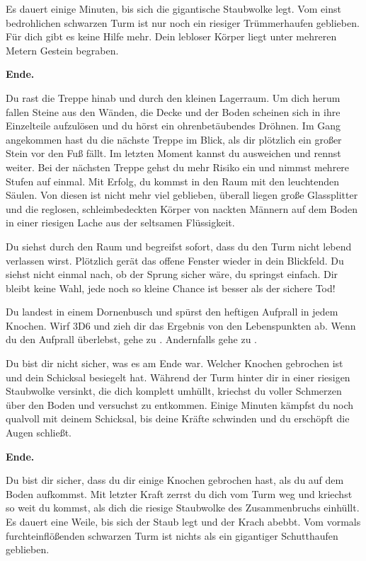 Es dauert einige Minuten, bis sich die gigantische Staubwolke legt. Vom einst bedrohlichen schwarzen Turm ist nur noch ein riesiger Trümmerhaufen geblieben. Für dich gibt es keine Hilfe mehr. Dein lebloser Körper liegt unter mehreren Metern Gestein begraben.

\textbf{Ende.}


Du rast die Treppe hinab und durch den kleinen Lagerraum. Um dich herum fallen Steine aus den Wänden, die Decke und der Boden scheinen sich in ihre Einzelteile aufzulösen und du hörst ein ohrenbetäubendes Dröhnen. Im Gang angekommen hast du die nächste Treppe im Blick, als dir plötzlich ein großer Stein vor den Fuß fällt. Im letzten Moment kannst du ausweichen und rennst weiter. Bei der nächsten Treppe gehst du mehr Risiko ein und nimmst mehrere Stufen auf einmal. Mit Erfolg, du kommst in den Raum mit den leuchtenden Säulen. Von diesen ist nicht mehr viel geblieben, überall liegen große Glassplitter und die reglosen, schleimbedeckten Körper von nackten Männern auf dem Boden in einer riesigen Lache aus der seltsamen Flüssigkeit.

Du siehst durch den Raum und begreifst sofort, dass du den Turm nicht lebend verlassen wirst. Plötzlich gerät das offene Fenster wieder in dein Blickfeld. Du siehst nicht einmal nach, ob der Sprung sicher wäre, du springst einfach. Dir bleibt keine Wahl, jede noch so kleine Chance ist besser als der sichere Tod!

Du landest in einem Dornenbusch und spürst den heftigen Aufprall in jedem Knochen. Wirf 3D6 und zieh dir das Ergebnis von den Lebenspunkten ab. Wenn du den Aufprall überlebst, gehe zu . Andernfalls gehe zu .


Du bist dir nicht sicher, was es am Ende war. Welcher Knochen gebrochen ist und dein Schicksal besiegelt hat. Während der Turm hinter dir in einer riesigen Staubwolke versinkt, die dich komplett umhüllt, kriechst du voller Schmerzen über den Boden und versuchst zu entkommen. Einige Minuten kämpfst du noch qualvoll mit deinem Schicksal, bis deine Kräfte schwinden und du erschöpft die Augen schließt.

\textbf{Ende.}


Du bist dir sicher, dass du dir einige Knochen gebrochen hast, als du auf dem Boden aufkommst. Mit letzter Kraft zerrst du dich vom Turm weg und kriechst so weit du kommst, als dich die riesige Staubwolke des Zusammenbruchs einhüllt. Es dauert eine Weile, bis sich der Staub legt und der Krach abebbt. Vom vormals furchteinflößenden schwarzen Turm ist nichts als ein gigantiger Schutthaufen geblieben.

